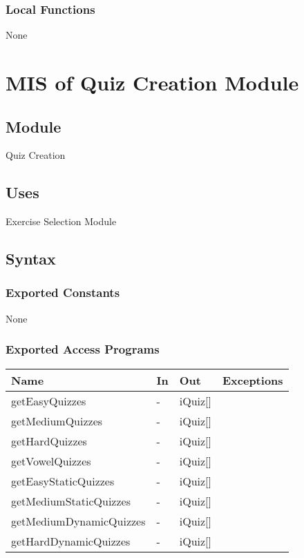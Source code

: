 \documentclass[12pt, titlepage]{article}
\begin{document}
\subsubsection{Local Functions}

None


\newpage

\section{MIS of Quiz Creation Module} \label{Module} 
\subsection{Module}
Quiz Creation
\subsection{Uses}
Exercise Selection Module
\subsection{Syntax}
 \subsubsection{Exported Constants}
 None
 \subsubsection{Exported Access Programs}

    \begin{center}
    \begin{tabular}{p{4cm} p{3cm} p{3cm} p{4cm}}
    \hline
    \textbf{Name} & \textbf{In} & \textbf{Out} & \textbf{Exceptions} \\
    \hline
    getEasyQuizzes & - & iQuiz[] & \\
    getMediumQuizzes & - & iQuiz[] & \\
    getHardQuizzes & - & iQuiz[] &  \\
    getVowelQuizzes & - & iQuiz[] & \\
    getEasyStaticQuizzes & - & iQuiz[] & \\
    getMediumStaticQuizzes & - & iQuiz[] & \\
    getMediumDynamicQuizzes & - & iQuiz[] &  \\
    getHardDynamicQuizzes & - & iQuiz[] & \\
    \hline
    \end{tabular}
    \end{center}
\end{document}
